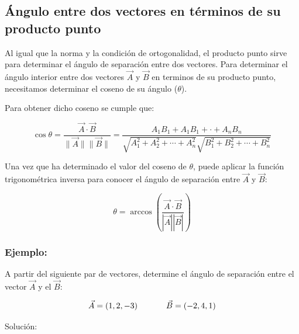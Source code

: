\documentclass{article}
\begin{document}
    \subsection{Ángulo entre dos vectores en términos de su producto punto}

        Al igual que la norma y la condición de ortogonalidad, el producto punto sirve para determinar el ángulo de separación entre dos vectores. Para determinar el ángulo interior entre dos vectores $\vec{A}$ y $\vec{B}$ en terminos de su producto punto, necesitamos determinar el coseno de su ángulo ($\theta$).

        Para obtener dicho coseno se cumple que:

        \begin{equation}
            \cos \theta = \frac{\vec{A} \cdot \vec{B}}{\parallel\vec{A}\parallel\parallel\vec{B}\parallel} = \frac{A_{1} B_{1}+A_{1} B_{1}+\cdot+A_{n} B_{n}}{\sqrt{A_{1}^{2}+A_{2}^{2}+\cdots+A_{n}^{2}} \sqrt{B_{1}^{2}+B_{2}^{2}+\cdots+B_{n}^{2}}}
        \end{equation}

        Una vez que ha determinado el valor del coseno de $\theta$, puede aplicar la función trigonométrica inversa para conocer el ángulo de separación entre $\vec{A}$ y $\vec{B}$:

        \begin{equation}
            \theta=\arccos \left(\frac{\vec{A} \cdot \vec{B}}{|\vec{A}||\vec{B}|}\right)
        \end{equation}

        \subsubsection*{Ejemplo:}

            A partir del siguiente par de vectores, determine el ángulo de separación entre el vector $\vec{A}$ y el  $\vec{B}$:

            \begin{gather*}
                \vec{A}=(1,2,-3) \hspace*{35 pt} \vec{B}=(-2,4,1)
            \end{gather*}
        
            Solución:
\end{document}
